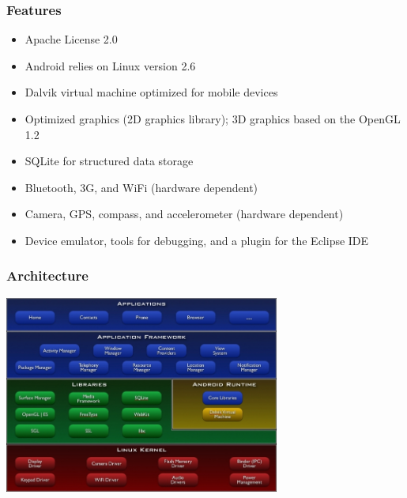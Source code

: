 \documentclass{beamer}
\begin{document}
\begin{frame}
\frametitle{Features}
\begin{itemize}
\item Apache License 2.0
\item Android relies on Linux version 2.6
\item Dalvik virtual machine optimized for mobile devices 
\item Optimized graphics (2D graphics library); 3D
  graphics based on the OpenGL 1.2
\item SQLite for structured data storage
\item Bluetooth, 3G, and WiFi (hardware dependent)
\item Camera, GPS, compass, and accelerometer (hardware dependent)
\item Device emulator, tools for debugging, and a plugin for the Eclipse IDE
\end{itemize}
\end{frame}


\begin{frame}
\frametitle{Architecture}
\begin{center}
  \includegraphics[height=6.5cm]{figs/android-architecture}
\end{center}
\end{frame}
\end{document}
